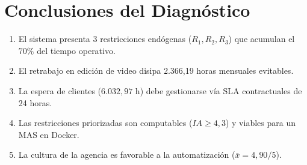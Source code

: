 \documentclass[11pt,a4paper]{article}
\begin{document}
\section{Conclusiones del Diagnóstico}\label{sec:conclusiones}
\begin{enumerate}
\item El sistema presenta 3 restricciones endógenas ($R_1, R_2, R_3$) que acumulan el $70\%$ del tiempo operativo.
\item El retrabajo en edición de video disipa 2.366,19 horas mensuales evitables.
\item La espera de clientes ($6.032,97$ h) debe gestionarse vía SLA contractuales de 24 horas.
\item Las restricciones priorizadas son computables ($IA \ge 4,3$) y viables para un MAS en Docker.
\item La cultura de la agencia es favorable a la automatización ($\bar{x} = 4,90/5$).
\end{enumerate}
\end{document}
